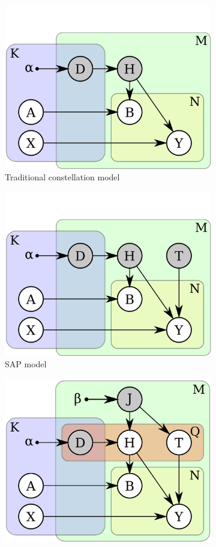 \begin{figure}[ht]
\centering
\begin{subfigure}[t]{0.48\linewidth}
	\includegraphics[width=0.8\linewidth]{fig/3dreg/graphicalModelNoPose.pdf}
	\caption{Traditional constellation model}	
	\label{fig:graphicalModelNoPose}
\end{subfigure}  
\begin{subfigure}[t]{0.48\linewidth}
	\includegraphics[width=0.8\linewidth]{fig/3dreg/graphicalModelNoParticle.pdf}
	\caption{SAP model}	
	\label{fig:graphicalModelNoParticle}
\end{subfigure}
\begin{subfigure}[t]{0.48\linewidth}
	\includegraphics[width=0.8\linewidth]{fig/3dreg/graphicalModelParticle.pdf}

\end{subfigure}
\end{figure}
